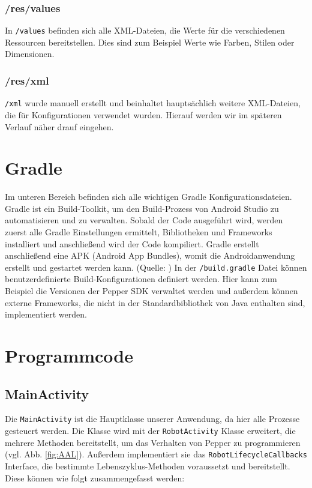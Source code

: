 \subsubsection*{/res/values}
In \verb|/values| befinden sich alle XML-Dateien, die Werte für die verschiedenen Ressourcen bereitstellen. Dies sind zum Beispiel Werte wie Farben, Stilen oder Dimensionen.

\subsubsection*{/res/xml}
\verb|/xml| wurde manuell erstellt und beinhaltet hauptsächlich weitere XML-Dateien, die für Konfigurationen verwendet wurden. Hierauf werden wir im späteren Verlauf näher drauf eingehen. 

\newpage
\section{Gradle}
Im unteren Bereich befinden sich alle wichtigen Gradle Konfigurationsdateien. Gradle ist ein Build-Toolkit, um den Build-Prozess von Android Studio zu automatisieren und zu verwalten. Sobald der Code ausgeführt wird, werden zuerst alle Gradle Einstellungen ermittelt, Bibliotheken und Frameworks installiert und anschließend wird der Code kompiliert. Gradle erstellt anschließend eine APK (Android App Bundles), womit die Androidanwendung erstellt und gestartet werden kann. (Quelle: \cite{Gradle})
In der \verb|/build.gradle| Datei können benutzerdefinierte Build-Konfigurationen definiert werden. Hier kann zum Beispiel die Versionen der Pepper SDK verwaltet werden und außerdem können externe Frameworks, die nicht in der Standardbibliothek von Java enthalten sind, implementiert werden.\\

\section{Programmcode}

\subsection{MainActivity}

Die \verb|MainActivity| ist die Hauptklasse unserer Anwendung, da hier alle Prozesse gesteuert werden. Die Klasse wird mit der \verb|RobotActivity| Klasse erweitert, die mehrere Methoden bereitstellt, um das Verhalten von Pepper zu programmieren (vgl. Abb. \ref{fig:AAL}). Außerdem implementiert sie das \verb|RobotLifecycleCallbacks| Interface, die bestimmte Lebenszyklus-Methoden voraussetzt 
und bereitstellt. Diese können wie folgt zusammengefasst werden:\\

